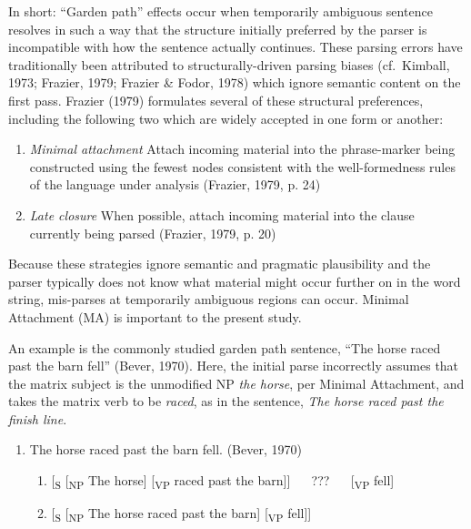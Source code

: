 \documentclass[11pt,oneside]{book}
\providecommand{\tightlist}{%
  \setlength{\itemsep}{0pt}\setlength{\parskip}{0pt}}
\begin{document}
In short: ``Garden path'' effects occur when temporarily ambiguous sentence resolves in such a way that the structure initially preferred by the parser is incompatible with how the sentence actually continues. These parsing errors have traditionally been attributed to structurally-driven parsing biases (cf.~Kimball, 1973; Frazier, 1979; Frazier \& Fodor, 1978) which ignore semantic content on the first pass. Frazier (1979) formulates several of these structural preferences, including the following two which are widely accepted in one form or another:

\begin{enumerate}
\def\labelenumi{(\arabic{enumi})}
\item
  \emph{Minimal attachment} \linebreak\nopagebreak
  Attach incoming material into the phrase-marker being constructed using the fewest nodes consistent with the well-formedness rules of the language under analysis (Frazier, 1979, p. 24)
\item
  \emph{Late closure} \linebreak\nopagebreak
  When possible, attach incoming material into the clause currently being parsed (Frazier, 1979, p. 20)
\end{enumerate}

Because these strategies ignore semantic and pragmatic plausibility and the parser typically does not know what material might occur further on in the word string, mis-parses at temporarily ambiguous regions can occur. Minimal Attachment (MA) is important to the present study.

An example is the commonly studied garden path sentence, ``The horse raced past the barn fell'' (Bever, 1970). Here, the initial parse incorrectly assumes that the matrix subject is the unmodified NP \emph{the horse}, per Minimal Attachment, and takes the matrix verb to be \emph{raced}, as in the sentence, \emph{The horse raced past the finish line}.

\begin{enumerate}
\def\labelenumi{(\arabic{enumi})}
\setcounter{enumi}{2}
\tightlist
\item
  The horse raced past the barn fell. (Bever, 1970)

  \begin{enumerate}
  \def\labelenumii{\alph{enumii})}
  \tightlist
  \item
    {[}\textsubscript{S} {[}\textsubscript{NP} The horse{]} {[}\textsubscript{VP} raced past the barn{]}{]}   ???   {[}\textsubscript{VP} fell{]}
  \item
    {[}\textsubscript{S} {[}\textsubscript{NP} The horse raced past the barn{]} {[}\textsubscript{VP} fell{]}{]}
  \end{enumerate}
\end{enumerate}
\end{document}
